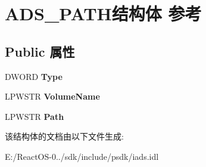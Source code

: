 \hypertarget{struct_a_d_s___p_a_t_h}{}\section{A\+D\+S\+\_\+\+P\+A\+T\+H结构体 参考}
\label{struct_a_d_s___p_a_t_h}
\subsection*{Public 属性}
\begin{DoxyCompactItemize}
\item 
\mbox{\label{struct_a_d_s___p_a_t_h_af4bd3ea3eb27454d8e196c63ea9a2844}} 
D\+W\+O\+RD {\bfseries Type}
\item 
\mbox{\label{struct_a_d_s___p_a_t_h_affcd3521c79d3c110656fac6976a82ef}} 
L\+P\+W\+S\+TR {\bfseries Volume\+Name}
\item 
\mbox{\label{struct_a_d_s___p_a_t_h_a3eb86dc64fe9803a5677588d9aadd033}} 
L\+P\+W\+S\+TR {\bfseries Path}
\end{DoxyCompactItemize}


该结构体的文档由以下文件生成\+:\begin{DoxyCompactItemize}
\item 
E\+:/\+React\+O\+S-\/0../sdk/include/psdk/iads.\+idl\end{DoxyCompactItemize}
